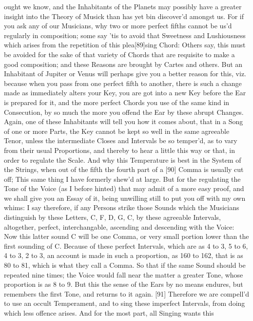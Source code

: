 \documentclass[letterpaper]{book}
\begin{document}
ought we know, and the Inhabitants of the Planets may possibly have a
greater insight into the Theory of Musick than has yet bin discover'd
amongst us. For if you ask any of our Musicians, why two or more perfect
fifths cannot be us'd regularly in composition; some say 'tis to avoid that
Sweetness and Lushiousness which arises from the repetition of this
plea[89]sing Chord: Others say, this must be avoided for the sake of that
variety of Chords that are requisite to make a good composition; and these
Reasons are brought by Cartes and others.  But an Inhabitant of Jupiter or
Venus will perhaps give you a better reason for this, viz. because when you
pass from one perfect fifth to another, there is such a change made as
immediately alters your Key, you are got into a new Key before the Ear is
prepared for it, and the more perfect Chords you use of the same kind in
Consecution, by so much the more you offend the Ear by these abrupt
Changes.  Again, one of these Inhabitants will tell you how it comes about,
that in a Song of one or more Parts, the Key cannot be kept so well in the
same agreeable Tenor, unless the intermediate Closes and Intervals be so
temper'd, as to vary from their usual Proportions, and thereby to hear a
little this way or that, in order to regulate the Scale. And why this
Temperature is best in the System of the Strings, when out of the fifth the
fourth part of a [90] Comma is usually cut off; This same thing I have
formerly shew'd at large.  But for the regulating the Tone of the Voice (as I
before hinted) that may admit of a more easy proof, and we shall give you an
Essay of it, being unwilling still to put you off with my own whims: I say
therefore, if any Persons strike those Sounds which the Musicians
distinguish by these Letters, C, F, D, G, C, by these agreeable Intervals,
altogether, perfect, interchangable, ascending and descending with the
Voice: Now this latter sound C will be one Comma, or very small portion
lower than the first sounding of C. Because of these perfect Intervals,
which are as 4 to 3, 5 to 6, 4 to 3, 2 to 3, an account is made in such a
proportion, as 160 to 162, that is as 80 to 81, which is what they call a
Comma. So that if the same Sound should be repeated nine times; the Voice
would fall near the matter a greater Tone, whose proportion is as 8 to 9.
But this the sense of the Ears by no means endures, but remembers the first
Tone, and returns to it again. [91] Therefore we are compell'd to use an
occult Temperament, and to sing these imperfect Intervals, from doing which
less offence arises. And for the most part, all Singing wants this
\end{document}
